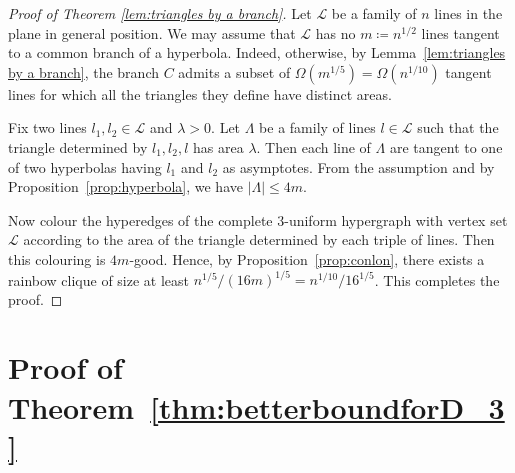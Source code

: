 \documentclass[a4paper,oneside,10pt]{amsart}
\begin{document}
\begin{proof}[Proof of Theorem \ref{lem:triangles by a branch}]
Let $\mathcal{L}$ be a family of $n$ lines in the plane in general position.
We may assume that $\mathcal{L}$ has no $m \coloneqq n^{1/2}$ lines tangent to a common branch of a hyperbola.
Indeed, otherwise, by Lemma~\ref{lem:triangles by a branch}, the branch $C$ admits a subset of $\Omega(m^{1/5})= \Omega(n^{1/10})$ tangent lines for which all the triangles they define have distinct areas.

Fix two lines $l_1,l_2\in \mathcal{L}$ and $\lambda>0$.
Let $\Lambda$ be a family of lines $l\in \mathcal{L}$ such that the triangle determined by $l_1,l_2,l$ has area $\lambda$.
Then each line of $\Lambda$ are tangent to one of two hyperbolas having $l_1$ and $l_2$ as asymptotes.
From the assumption and by Proposition~\ref{prop:hyperbola}, we have $|\Lambda|\leq 4m$.

Now colour the hyperedges of the complete $3$-uniform hypergraph with vertex set $\mathcal{L}$ according to the area of the triangle determined by each triple of lines.
Then this colouring is $4m$-good.
Hence, by Proposition~\ref{prop:conlon}, there exists a rainbow clique of size at least $n^{1/5}/(16m)^{1/5}=n^{1/10}/16^{1/5}$. This completes the proof.
\end{proof}





\section{Proof of Theorem~\ref{thm:betterboundforD_3}}
\end{document}
